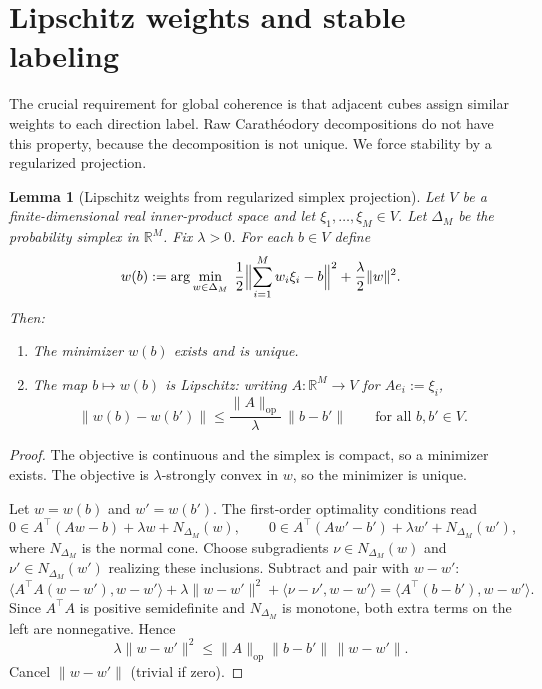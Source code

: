 \documentclass[11pt]{article}
\numberwithin{equation}{section}
\theoremstyle{plain}
\newtheorem{lemma}[theorem]{Lemma}
\theoremstyle{definition}
\theoremstyle{remark}
\newcommand{\R}{\mathbb{R}}
\begin{document}
\section{Lipschitz weights and stable labeling}\label{sec:lipschitz}

The crucial requirement for global coherence is that adjacent cubes assign similar weights to each direction label.  Raw Carath\'eodory decompositions do not have this property, because the decomposition is not unique.  We force stability by a regularized projection.

\begin{lemma}[Lipschitz weights from regularized simplex projection]\label{lem:lipschitz}
Let $V$ be a finite-dimensional real inner-product space and let $\xi_1,\dots,\xi_M\in V$.  Let $\Delta_M$ be the probability simplex in $\R^M$.  Fix $\lambda>0$.  For each $b\in V$ define
\[
w(b):=\arg\min_{w\in\Delta_M}\;\frac12\Bigl\|\sum_{i=1}^M w_i\xi_i-b\Bigr\|^2+\frac{\lambda}{2}\|w\|^2.
\]
Then:
\begin{enumerate}
\item[\textnormal{(i)}] The minimizer $w(b)$ exists and is unique.
\item[\textnormal{(ii)}] The map $b\mapsto w(b)$ is Lipschitz: writing $A:\R^M\to V$ for $Ae_i:=\xi_i$,
\[
\|w(b)-w(b')\|\le \frac{\|A\|_{\mathrm{op}}}{\lambda}\,\|b-b'\|
\qquad\text{for all }b,b'\in V.
\]
\end{enumerate}
\end{lemma}

\begin{proof}
The objective is continuous and the simplex is compact, so a minimizer exists.  The objective is $\lambda$-strongly convex in $w$, so the minimizer is unique.

Let $w=w(b)$ and $w'=w(b')$.  The first-order optimality conditions read
\[
0\in A^\top(Aw-b)+\lambda w + N_{\Delta_M}(w),
\qquad
0\in A^\top(Aw'-b')+\lambda w' + N_{\Delta_M}(w'),
\]
where $N_{\Delta_M}$ is the normal cone.  Choose subgradients $\nu\in N_{\Delta_M}(w)$ and $\nu'\in N_{\Delta_M}(w')$ realizing these inclusions.  Subtract and pair with $w-w'$:
\[
\langle A^\top A(w-w'),w-w'\rangle + \lambda\|w-w'\|^2 + \langle \nu-\nu',w-w'\rangle
= \langle A^\top(b-b'),w-w'\rangle.
\]
Since $A^\top A$ is positive semidefinite and $N_{\Delta_M}$ is monotone, both extra terms on the left are nonneg\-ative.  Hence
\[
\lambda\|w-w'\|^2 \le \|A\|_{\mathrm{op}}\|b-b'\|\,\|w-w'\|.
\]
Cancel $\|w-w'\|$ (trivial if zero).
\end{proof}
\end{document}
